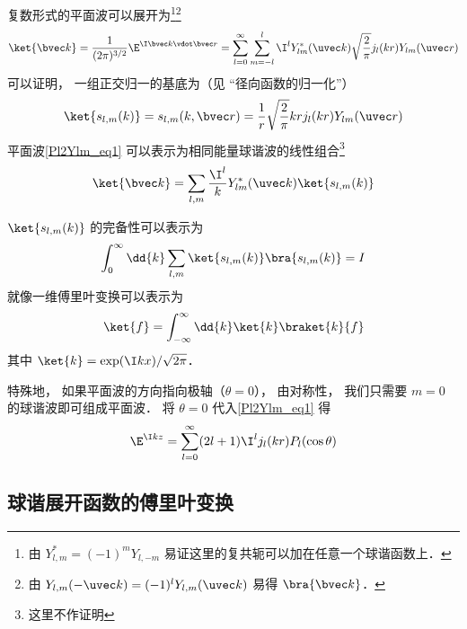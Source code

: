 
\begin{issues}
\issueAbstract
\end{issues}


复数形式的平面波可以展开为\footnote{由 $Y_{l,m}^* = (-1)^m Y_{l,-m}$ 易证这里的复共轭可以加在任意一个球谐函数上．}\footnote{由 $Y_{l,m}(-\uvec k) = (-1)^l Y_{l,m}(\uvec k)$ 易得 $\bra{\bvec k}$．}
\begin{equation}\label{Pl2Ylm_eq1}
\ket{\bvec k} = \frac{1}{(2\pi)^{3/2}}\E^{\I \bvec k \vdot \bvec r} = \sum_{l=0}^{\infty} \sum_{m=-l}^l \I^l Y_{lm}^*(\uvec k) \sqrt{\frac{2}{\pi}} j_l(kr) Y_{lm}(\uvec r)
\end{equation}
可以证明， 一组正交归一的基底为（见 “径向函数的归一化”）
\begin{equation}
\ket{s_{l,m}(k)} = s_{l,m}(k,\bvec r) = \frac{1}{r}\sqrt{\frac{2}{\pi}}kr j_l(kr) Y_{lm}(\uvec r)
\end{equation}
平面波\autoref{Pl2Ylm_eq1} 可以表示为相同能量球谐波的线性组合\footnote{这里不作证明}
\begin{equation}\label{Pl2Ylm_eq3}
\ket{\bvec k} = \sum_{l,m}\frac{\I^l}{k} Y_{lm}^*(\uvec k)\ket{s_{l,m}(k)} 
\end{equation}

$\ket{s_{l,m}(k)}$ 的完备性可以表示为
\begin{equation}
\int_0^\infty \dd{k} \sum_{l,m} \ket{s_{l,m}(k)}\bra{s_{l,m}(k)} = I
\end{equation}
就像一维傅里叶变换可以表示为%
\begin{equation}
\ket{f} = \int_{-\infty}^{\infty} \dd{k} \ket{k}\braket{k}{f}
\end{equation}
其中 $\ket{k} = \exp(\I kx)/\sqrt{2\pi}$．

特殊地， 如果平面波的方向指向极轴（$\theta = 0$）， 由对称性， 我们只需要 $m = 0$ 的球谐波即可组成平面波． 将 $\theta = 0$ 代入\autoref{Pl2Ylm_eq1} 得
\begin{equation}
\E^{\I kz} = \sum_{l=0}^\infty (2l+1) \I^l j_l(kr) P_l(\cos\theta)
\end{equation}

\subsection{球谐展开函数的傅里叶变换}

